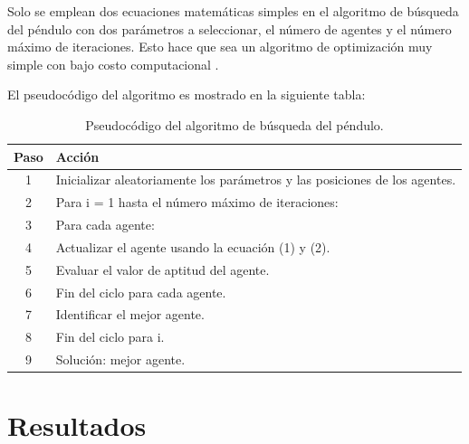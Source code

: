 \documentclass[conference]{IEEEtran}
\begin{document}
Solo se emplean dos ecuaciones matemáticas simples en el algoritmo de búsqueda
del péndulo con dos parámetros a seleccionar, el número de agentes y el número
máximo de iteraciones. Esto hace que sea un algoritmo de optimización muy
simple con bajo costo computacional \cite{aziz2022}.

El pseudocódigo del algoritmo es mostrado en la siguiente tabla:

\renewcommand{\tablename}{Tabla}
\begin{table}[h]
    \centering
    \begin{tabular}{|c|l|}
        \hline
        \textbf{Paso} & \textbf{Acción}
        \\
        \hline
        1             & Inicializar aleatoriamente los parámetros y las
        posiciones de los agentes.                                           \\
        2             & Para i = 1 hasta el número máximo de iteraciones:
        \\
        3             & \hspace{1em} Para cada agente:
        \\
        4             & \hspace{2em} Actualizar el agente usando la ecuación
        (1) y (2).                                                           \\
        5             & \hspace{2em} Evaluar el valor de aptitud del agente.
        \\
        6             & \hspace{1em} Fin del ciclo para cada agente.
        \\
        7             & \hspace{1em} Identificar el mejor agente.
        \\
        8             & Fin del ciclo para i.
        \\
        9             & Solución: mejor agente.
        \\
        \hline
    \end{tabular}
    \caption{Pseudocódigo del algoritmo de búsqueda del péndulo.}
    \label{table:pendulumSearchAlgorithm}
\end{table}

\section{Resultados}
\label{sec:Res}
\end{document}

